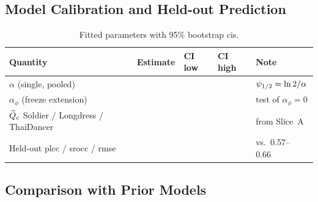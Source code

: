 \subsection{Model Calibration and Held-out Prediction}
\label{sec:res-calibration}
\begin{table}[t]
  \caption{Fitted \crystal parameters with 95\% bootstrap \glspl{ci}.
  }
  \label{tab:params}
  \centering
  \small
  \begin{tabular}{@{}lllll@{}}
    \toprule
    Quantity & Estimate & CI low & CI high & Note \\
    \midrule
    $\alpha$ (single, pooled)         & & & & $\psi_{1/2} = \ln 2/\alpha$ \\
    $\alpha_\phi$ (freeze extension)  & & & & test of $\alpha_\phi = 0$ \\
    $\widetilde{Q}_c$ Soldier / Longdress / ThaiDancer & & & & from Slice~A \\
    Held-out \gls{plcc} / \gls{srocc} / \gls{rmse} & & & & vs.\ 0.57--0.66~\cite{udora2026tmm} \\
    \bottomrule
  \end{tabular}
\end{table}

\subsection{Comparison with Prior Models}
\label{sec:res-comparison}

